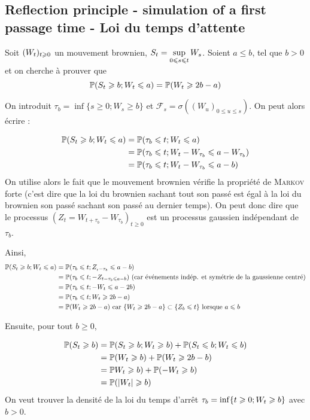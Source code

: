 \subsection{Reflection principle - simulation of a first passage time - Loi du temps d'attente}
\newcommand{\st}{S_t}
Soit $(W_t)_{t \geqslant 0}$ un mouvement brownien, $\displaystyle S_t = \sup_{0 \leqslant s \leqslant t} W_s$. Soient $a \leq b$, tel que $b>0$ et on cherche à prouver que 
\[ \P(\st \geq b; \wt \leq a) = \P(\wt \geq 2b-a) \]

\newcommand{\fs}{\mathcal{F}_s}
On introduit $\tau_b = \inf\{s \geq 0; W_s \geq b\}$ et $\fs = \sigma((W_u)_{0 \leq u \leq s})$. On peut alors écrire :

\newcommand{\wtb}{W_{\tau_b}}
\begin{equation*}
\begin{split}
  \P(\st \geq b; \wt \leq a) &= \P(\tau_b \leq t; \wt \leq a) \\
  &= \P(\tau_b \leq t; \wt - \wtb \leq a - \wtb) \\
  &= \P(\tau_b \leq t; \wt - \wtb \leq a-b) 
\end{split}
\end{equation*}
On utilise alors le fait que le mouvement brownien vérifie la propriété de \textsc{Markov} forte (c'est dire que la loi du brownien sachant tout son passé est égal à la loi du brownien son passé sachant son passé au dernier temps). On peut donc dire que le processus $(Z_t = W_{t+\tau_b} - \wtb)_{t \geq 0}$ est un processus gaussien indépendant de $\tau_b$.

Ainsi,
\begin{equation*}
\begin{split}
  \P(\st \geq b; \wt \leq a) &= \P(\tau_b \leq t ; Z_{_t-\tau_b} \leq a-b) \\
  &= \P(\tau_b \leq t; - Z_{t- \tau_b \leq a-b}) \text{ (car événements indép. et symétrie de la gaussienne centré)} \\
  &= \P(\tau_b \leq t; - \wt \leq a - 2b) \\
  &= \P(\tau_b \leq t; \wt \geq 2b-a)  \\
  &= \P(\wt \geq 2b-a) \text{ car } \{ \wt \geq 2b-a \} \subset \{ Z_b \leq t \} \text{ lorsque } a \leq b
\end{split}
\end{equation*}

Ensuite, pour tout $b\geq 0$, 

\begin{equation*}
\begin{split}
  \P(\st \geq b) &= \P(\st \geq b; \wt \geq b) + \P(\st \leq b; \wt \leq b) \\
  &= \P(\wt \geq b) + \P(\wt \geq 2b-b) \\
  &= \P\wt \geq b) + \P(- \wt \geq b) \\
  &= \P(\vert \wt \vert \geq b)
\end{split}
\end{equation*}
On veut trouver la densité de la loi du temps d'arrêt $\tau_b = \inf \{ t \geqslant 0; W_t \geqslant b \}$ avec $b > 0$. 

